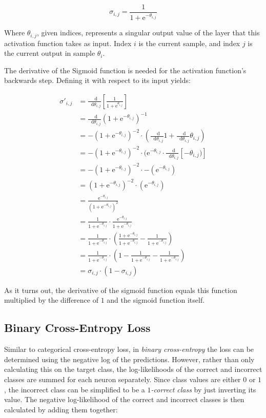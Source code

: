 \documentclass[a4paper]{article}
\newcommand{\euler}{\mathrm{e}}
\newcommand*\diff{\mathop{}\!\mathrm{d}}
\begin{document}
\begin{equation*}
    \sigma_{i,j} = \frac{1}{1 + \euler^{-\theta_{i,j}}}
\end{equation*}

Where $\theta_{i,j}$, given indices, represents a singular output value of the layer that this activation function takes as input. Index $i$ is the current sample, and index $j$ is the current output in sample $\theta_i$. 

The derivative of the Sigmoid function is needed for the activation function's backwards step. Defining it with respect to its input yields:

\begin{align*}
    \sigma'_{i,j} &= \frac{\diff}{\diff\theta_{i,j}}\left[\frac{1}{1+\euler^{\theta_{i,j}}}\right] \\
    &= \frac{\diff}{\diff\theta_{i,j}}(1+\euler^{-\theta_{i,j}})^{-1} \\
    &= -(1+\euler^{-\theta_{i,j}})^{-2} \cdot \left( \frac{\diff}{\diff\theta_{i,j}}1+\frac{\diff}{\diff\theta_{i,j}}\theta_{i,j} \right) \\
    &= -(1+\euler^{-\theta_{i,j}})^{-2} \cdot (\euler^{-\theta_{i,j}} \cdot \frac{\diff}{\diff\theta_{i,j}} [-\theta_{i,j})] \\
    &= -(1+\euler^{-\theta_{i,j}})^{-2} \cdot -(\euler^{-\theta_{i,j}}) \\
    &= (1+\euler^{-\theta_{i,j}})^{-2} \cdot (\euler^{-\theta_{i,j}}) \\
    &= \frac{\euler^{-\theta_{i,j}}}{(1+\euler^{-\theta_{i,j}})^2} \\
    &= \frac{1}{1+\euler^{-\theta_{i,j}}} \cdot \frac{\euler^{-\theta_{i,j}}}{1+\euler^{-\theta_{i,j}}} \\
    &= \frac{1}{1+\euler^{-\theta_{i,j}}} \cdot \left( \frac{1+\euler^{-\theta_{i,j}}}{1+\euler^{-\theta_{i,j}}} - \frac{1}{1+\euler^{-\theta_{i,j}}} \right) \\
    &= \frac{1}{1+\euler^{-\theta_{i,j}}} \cdot \left( 1 - \frac{1}{1+\euler^{-\theta_{i,j}}} - \frac{1}{1+\euler^{-\theta_{i,j}}} \right) \\
    &= \sigma_{i,j} \cdot (1-\sigma_{i,j})
\end{align*}

As it turns out, the derivative of the sigmoid function equals this function multiplied by the difference of $1$ and the sigmoid function itself.

\subsection*{Binary Cross-Entropy Loss}
Similar to categorical cross-entropy loss, in \emph{binary cross-entropy} the loss can be determined using the negative log of the predictions. However, rather than only calculating this on the target class, the log-likelihoods of the correct and incorrect classes are summed for each neuron separately. Since class values are either $0$ or $1$, the incorrect class can be simplified to be a \emph{$1$-correct class} by just inverting its value. The negative log-likelihood of the correct and incorrect classes is then calculated by adding them together:
\end{document}
